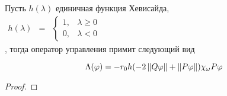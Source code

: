 \begin{remark}
Пусть $h(\lambda)$ единичная функция Хевисайда, \\
$
    \begin{matrix}
    h(\lambda) & =
    & \left\{
    \begin{matrix}
    1, & \lambda \ge 0 \\
    0, & \lambda < 0
    \end{matrix} \right.
    \end{matrix}
$\\

, тогда оператор управления примит следующий вид

\begin{equation}
    \Lambda(\varphi) = -r_0 h(-2\left\lVert Q\varphi\right\rVert +
    \left\lVert P\varphi\right\rVert)\chi_{\omega}P\varphi
\end{equation}

\end{remark}


\begin{proof}
    
\end{proof}




